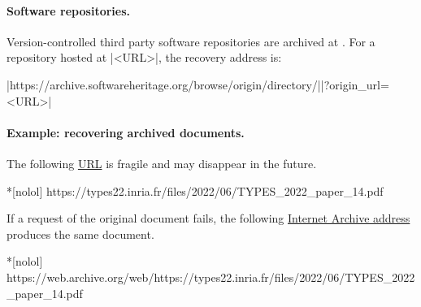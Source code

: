 \paragraph*{Software repositories.}
Version-controlled third party software repositories are archived at
\href{https://softwareheritage.org}{}.
For a repository hosted at \pr|<URL>|, the recovery address is:%
\begin{center}\pr|https://archive.softwareheritage.org/browse/origin/directory/|\mbox{\pr|?origin_url=<URL>|}\end{center}

\paragraph*{Example: recovering archived documents.}\mbox{}

The following \href{https://types22.inria.fr/files/2022/06/TYPES_2022_paper_14.pdf}{URL} is fragile and may disappear in the future.
\begin{center}
\begin{minipage}{\textwidth}
\begin{cmdlisting}*[nolol]
https://types22.inria.fr/files/2022/06/TYPES_2022_paper_14.pdf
\end{cmdlisting}
\end{minipage}
\end{center}

If a request of the original document fails,
the following \href{https://web.archive.org/web/https://types22.inria.fr/files/2022/06/TYPES_2022_paper_14.pdf}
{Internet Archive address} produces the same document.
\begin{center}
\begin{minipage}{\textwidth}
\begin{cmdlisting}*[nolol]
https://web.archive.org/web/https://types22.inria.fr/files/2022/06/TYPES_2022_paper_14.pdf
\end{cmdlisting}
\end{minipage}
\end{center}